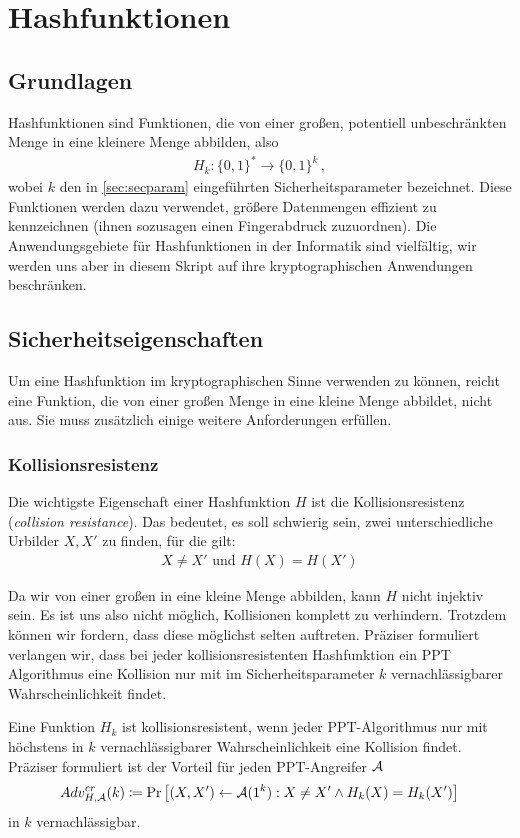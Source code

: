 \chapter{Hashfunktionen}\label{cha:hash}
\section{Grundlagen}
Hashfunktionen \indexHashFunction sind Funktionen, die von einer großen,
potentiell unbeschränkten Menge in eine kleinere Menge abbilden, also 
\begin{align*}
H_k\colon \{0,1\}^* \rightarrow \{0,1\}^k\, ,
\end{align*}
wobei $k$ den in \ref{sec:secparam} eingeführten Sicherheitsparameter
bezeichnet.  Diese Funktionen werden dazu verwendet, größere Datenmengen
effizient zu kennzeichnen (ihnen sozusagen einen Fingerabdruck
zuzuordnen). Die Anwendungsgebiete für Hashfunktionen in der Informatik
sind vielfältig, wir werden uns aber in diesem Skript auf ihre
kryptographischen Anwendungen beschränken\indexCryptHashFunction.

\section{Sicherheitseigenschaften}
Um eine Hashfunktion im kryptographischen Sinne \indexCryptHashFunction
verwenden zu können, reicht eine Funktion, die von einer großen Menge in
eine kleine Menge abbildet, nicht aus. 
Sie muss zusätzlich einige weitere Anforderungen erfüllen.

\subsection{Kollisionsresistenz}
Die wichtigste Eigenschaft einer Hashfunktion $H$ ist die
Kollisionsresistenz (\emph{collision
  resistance})\indexCollisionResistance. Das bedeutet, es soll schwierig
sein, zwei unterschiedliche Urbilder $X, X'$ zu finden, für die gilt: 
\begin{align*}
X \neq X' \text{ und } H(X) = H(X')
\end{align*}

Da wir von einer großen in eine kleine Menge abbilden, kann $H$ nicht
injektiv sein. Es ist uns also nicht möglich, Kollisionen komplett zu
verhindern. Trotzdem können wir fordern, dass diese möglichst selten
auftreten. Präziser formuliert verlangen wir, dass bei jeder
kollisionsresistenten Hashfunktion ein PPT Algorithmus eine Kollision
nur mit im Sicherheitsparameter $k$ vernachlässigbarer
Wahrscheinlichkeit findet.
\begin{definition}[Kollisionsresistenz]
Eine Funktion $H_k$ ist kollisionsresistent\indexCollisionResistance,
wenn jeder PPT-Algorithmus nur mit höchstens in $k$ vernachlässigbarer
Wahrscheinlichkeit eine Kollision findet.  Präziser formuliert ist der
Vorteil für jeden PPT-Angreifer $\mathcal{A}$
\begin{align*}
Adv^{cr}_{H,\mathcal{A}}(k)\coloneqq \Pr \left[ (X, X') \leftarrow \mathcal{A}(1^k) : X \neq X'
  \land H_k(X) = H_k(X')\right] 
\end{align*}
in $k$ vernachlässigbar.
\end{definition}

